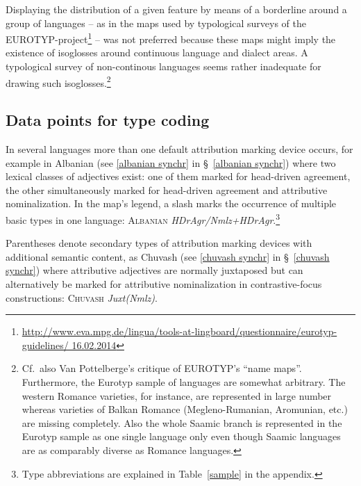 Displaying the distribution of a given feature by means of a borderline around a group of languages – as in the maps used by typological surveys of the EUROTYP-project\footnote{\url{http://www.eva.mpg.de/lingua/tools-at-lingboard/questionnaire/eurotyp-guidelines/ 16.02.2014}} – was not preferred because these maps might imply the existence of isoglosses around continuous language and dialect areas. A typological survey of non-continous languages seems rather inadequate for drawing such isoglosses.\footnote{Cf.~also Van Pottelberge's \citeyear{van-pottelberge2001} critique of EUROTYP's “name maps”. Furthermore, the Eurotyp sample of languages are somewhat arbitrary. The western Romance varieties, for instance, are represented in large number whereas varieties of Balkan Romance (Megleno-Rumanian, Aromunian, etc.) are missing completely. Also the whole Saamic branch is represented in the Eurotyp sample as one single language only even though Saamic languages are as comparably diverse as Romance languages.}

\subsection[Type coding]{Data points for type coding}
In several languages more than one default attribution marking device occurs, for example in Albanian (see \ref{albanian synchr} in \S~\ref{albanian synchr}) where two lexical classes of adjectives exist: one of them marked for head-driven agreement, the other simultaneously marked for head-driven agreement and attributive nominalization. In the map's legend, a slash marks the occurrence of multiple basic types in one language: \textsc{Albanian} \textit{HDrAgr/Nmlz+HDrAgr}.\footnote{Type abbreviations are explained in Table~\ref{sample} in the appendix.}

Parentheses denote secondary types of attribution marking devices with additional semantic content, as Chuvash (see \ref{chuvash synchr} in \S~\ref{chuvash synchr}) where attributive adjectives are normally juxtaposed but can alternatively be marked for attributive nominalization in contrastive-focus constructions: \textsc{Chuvash} \textit{Juxt(Nmlz)}.


